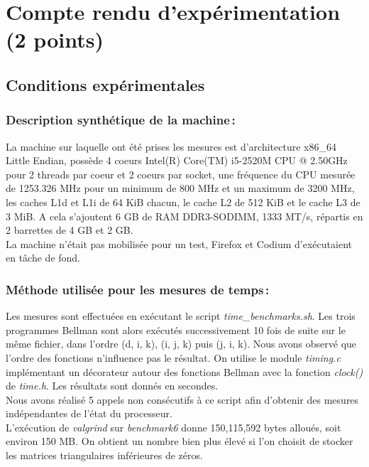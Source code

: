 \documentclass[a4paper, 10pt, french]{article}
\begin{document}
\section{Compte rendu d'expérimentation (2 points)}
\subsection{Conditions expérimentales}

\subsubsection{Description synthétique de la machine\,:}

La machine sur laquelle ont été prises les mesures est d'architecture x86\_64 Little Endian, possède 4 coeurs Intel(R) Core(TM) i5-2520M CPU @ 2.50GHz pour 2 threads par coeur et 2 coeurs par socket, une fréquence du CPU mesurée de 1253.326 MHz pour un minimum de 800 MHz et un maximum de 3200 MHz, les caches L1d et L1i de 64 KiB chacun, le cache L2 de 512 KiB et le cache L3 de 3 MiB. 
A cela s'ajoutent 6 GB de RAM DDR3-SODIMM, 1333 MT/s, répartis en 2 barrettes de 4 GB et 2 GB.
\\

La machine n'était pas mobilisée pour un test, Firefox et Codium d'exécutaient en tâche de fond.

\subsubsection{Méthode utilisée pour les mesures de temps\,: }

Les mesures sont effectuées en exécutant le script {\em time\_benchmarks.sh}. Les trois programmes Bellman sont alors exécutés successivement 10 fois de suite sur le même fichier, dans l'ordre (d, i, k), (i, j, k) puis (j, i, k). Nous avons observé que l'ordre des fonctions n'influence pas le résultat. 
On utilise le module {\em timing.c} implémentant un décorateur autour des fonctions Bellman avec la fonction {\em clock()} de {\em time.h}. Les résultats sont donnés en secondes. \\

Nous avons réalisé 5 appels non consécutifs à ce script afin d'obtenir des mesures indépendantes de l'état du processeur. \\

L'exécution de {\em valgrind} sur {\em benchmark6} donne 150,115,592 bytes alloués, soit environ 150 MB. On obtient un nombre bien plus élevé si l'on choisit de stocker les matrices triangulaires inférieures de zéros.
\end{document}
